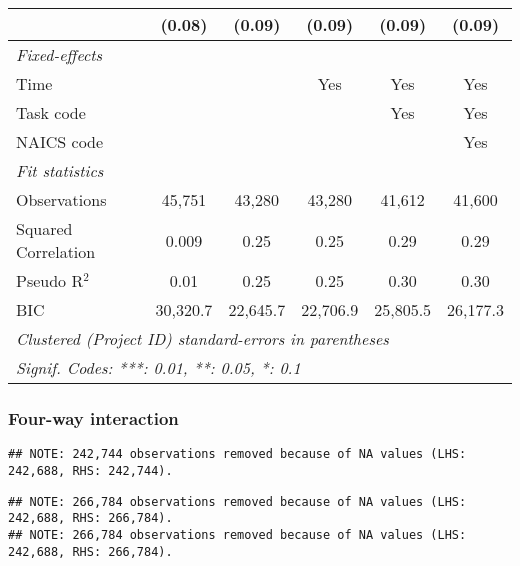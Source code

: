 \documentclass[
]{article}
\begin{document}
\begin{table}[htbp]
\begin{tabular}{lccccc}
                                                    & (0.08)        & (0.09)       & (0.09)       & (0.09)       & (0.09)\\
      \midrule \emph{Fixed-effects} &   &   &   &   &  \\
      Time                                          &               &              & Yes          & Yes          & Yes\\
      Task code                                     &               &              &              & Yes          & Yes\\
      NAICS code                                    &               &              &              &              & Yes\\
      \midrule \emph{Fit statistics} &   &   &   &   &  \\
      Observations                                  & 45,751        & 43,280       & 43,280       & 41,612       & 41,600\\
      Squared Correlation                           & 0.009         & 0.25         & 0.25         & 0.29         & 0.29\\
      Pseudo R$^2$                                  & 0.01          & 0.25         & 0.25         & 0.30         & 0.30\\
      BIC                                           & 30,320.7      & 22,645.7     & 22,706.9     & 25,805.5     & 26,177.3\\
      \midrule\midrule\multicolumn{6}{l}{\emph{Clustered (Project ID) standard-errors in parentheses}}\\
      \multicolumn{6}{l}{\emph{Signif. Codes: ***: 0.01, **: 0.05, *: 0.1}}\\
   \end{tabular}
\end{table}

\hypertarget{four-way-interaction}{%
\subsubsection{Four-way interaction}\label{four-way-interaction}}

\begin{verbatim}
## NOTE: 242,744 observations removed because of NA values (LHS: 242,688, RHS: 242,744).
\end{verbatim}

\begin{verbatim}
## NOTE: 266,784 observations removed because of NA values (LHS: 242,688, RHS: 266,784).
## NOTE: 266,784 observations removed because of NA values (LHS: 242,688, RHS: 266,784).
\end{verbatim}
\end{document}
